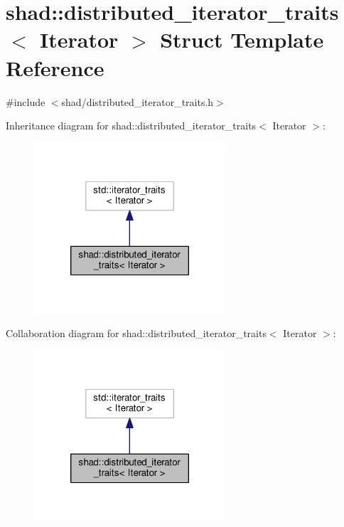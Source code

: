 \hypertarget{structshad_1_1distributed__iterator__traits}{\section{shad\-:\-:distributed\-\_\-iterator\-\_\-traits$<$ Iterator $>$ Struct Template Reference}
\label{structshad_1_1distributed__iterator__traits}
}


{\ttfamily \#include $<$shad/distributed\-\_\-iterator\-\_\-traits.\-h$>$}



Inheritance diagram for shad\-:\-:distributed\-\_\-iterator\-\_\-traits$<$ Iterator $>$\-:
\nopagebreak
\begin{figure}[H]
\begin{center}
\leavevmode
\includegraphics[width=202pt]{structshad_1_1distributed__iterator__traits__inherit__graph}
\end{center}
\end{figure}


Collaboration diagram for shad\-:\-:distributed\-\_\-iterator\-\_\-traits$<$ Iterator $>$\-:
\nopagebreak
\begin{figure}[H]
\begin{center}
\leavevmode
\includegraphics[width=202pt]{structshad_1_1distributed__iterator__traits__coll__graph}
\end{center}
\end{figure}
